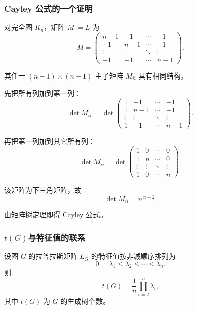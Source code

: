 \subsubsection{Cayley 公式的一个证明}

对完全图 $K_n$，矩阵 $M:=L$ 为
\[
M=\begin{pmatrix}
n-1 & -1 & \cdots & -1\\
-1 & n-1 & \cdots & -1\\
\vdots & \vdots & \ddots & \vdots\\
-1 & -1 & \cdots & n-1
\end{pmatrix}.
\]

其任一 $(n-1)\times(n-1)$ 主子矩阵 $M_{ii}$ 具有相同结构。

先把所有列加到第一列：
\[
\det M_{ii}
=\det
\begin{pmatrix}
1 & -1 & \cdots & -1\\
1 & n-1 & \cdots & -1\\
\vdots & \vdots & \ddots & \vdots\\
1 & -1 & \cdots & n-1
\end{pmatrix}.
\]

再把第一列加到其它所有列：
\[
\det M_{ii}
=\det
\begin{pmatrix}
1 & 0 & \cdots & 0\\
1 & n & \cdots & 0\\
\vdots & \vdots & \ddots & \vdots\\
1 & 0 & \cdots & n
\end{pmatrix}.
\]

该矩阵为下三角矩阵，故
\[
\det M_{ii}=n^{\,n-2}.
\]

由矩阵树定理即得 Cayley 公式。

\subsubsection{$t(G)$与特征值的联系}
\begin{theorem}\label{thm:laplacian-tree}
设图 $G$ 的拉普拉斯矩阵 $L_G$ 的特征值按非减顺序排列为
\[
0=\lambda_1 \le \lambda_2 \le \cdots \le \lambda_n.
\]
则
\[
t(G)=\frac{1}{n}\prod_{i=2}^n \lambda_i,
\]
其中 $t(G)$ 为 $G$ 的生成树个数。
\end{theorem}

